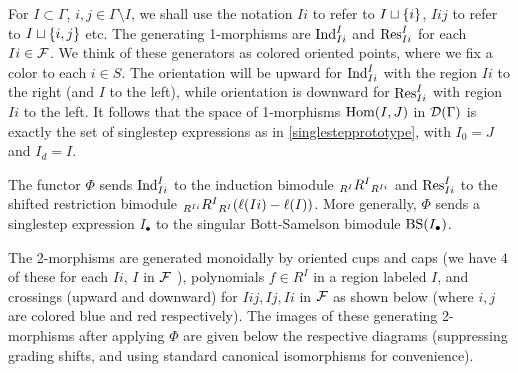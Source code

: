 For $I \subset \Gamma$, $i,j\in \Gamma \setminus I$, we shall use the notation $Ii$ to refer to $I\sqcup \set{i}$, $Iij$ to refer to $I\sqcup \set{i,j}$ etc.
The generating 1-morphisms are $\Ind_{Ii}^{I}$ and $\Res_{Ii}^{I}$ for each $Ii \in \mc{F}$. 
We think of these generators as colored oriented points, where we fix a color to each $i \in S$.
The orientation will be upward for $\Ind_{Ii}^{I}$ with the region $Ii$ to the right (and $I$ to the left), while orientation is downward for $\Res_{Ii}^{I}$ with region $Ii$ to the left.
It follows that the space of 1-morphisms 
$\Hom(I,J)$ in $\DiagSBS(\Gamma)$ is exactly the set of singlestep expressions as in \cref{singlestepprototype}, with $I_0=J$ and $I_d=I$.

The functor $\Phi$ sends $\Ind_{Ii}^{I}$ to the induction bimodule $\Bimod{R^{I}}{R^{Ii}}{R^{I}}$ and $\Res_{Ii}^{I}$ to the 
shifted restriction bimodule $\Bimod{R^{Ii}}{R^{I}}{R^{I}} (\ell(Ii)-\ell(I))$.
More generally, $\Phi$ sends a singlestep expression $I_\bullet$ to the singular Bott-Samelson bimodule $\BS(I_\bullet)$.

The 2-morphisms are generated monoidally by oriented cups and caps (we have 4 of these for each $Ii$, $I$ in $\mc{F}$ ), polynomials $f \in R^I$ in a region labeled $I$, and crossings (upward and downward) for $Iij, Ij, Ii$ in $\mc{F}$ as shown below (where $i, j$ are colored blue and red respectively). The images of these generating 2-morphisms after applying $\Phi$ are given below the respective diagrams (suppressing grading shifts, and using standard canonical isomorphisms for convenience). 

